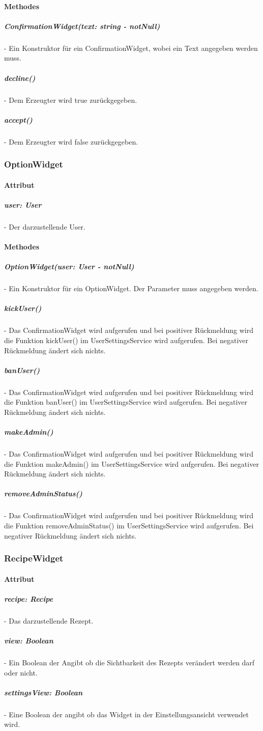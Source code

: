 \documentclass[parskip=full]{scrartcl}
\begin{document}
        \paragraph*{Methodes}
            \subparagraph*{ConfirmationWidget(text: string - notNull)} - Ein Konstruktor für ein ConfirmationWidget, wobei ein Text angegeben werden muss.
            \subparagraph*{decline()} - Dem Erzeugter wird true zurückgegeben.
            \subparagraph*{accept()} - Dem Erzeugter wird false zurückgegeben.

    \subsubsection{OptionWidget}
        \paragraph*{Attribut}
            \subparagraph*{user: User} - Der darzustellende User.

        \paragraph*{Methodes}
            \subparagraph*{OptionWidget(user: User - notNull)} - Ein Konstruktor für ein OptionWidget. Der Parameter muss angegeben werden. 
            \subparagraph*{kickUser()} - Das ConfirmationWidget wird aufgerufen und bei positiver Rückmeldung wird die Funktion kickUser() im UserSettingsService wird aufgerufen. Bei negativer Rückmeldung ändert sich nichts.
            \subparagraph*{banUser()} - Das ConfirmationWidget wird aufgerufen und bei positiver Rückmeldung wird die Funktion banUser() im UserSettingsService wird aufgerufen. Bei negativer Rückmeldung ändert sich nichts.
            \subparagraph*{makeAdmin()} - Das ConfirmationWidget wird aufgerufen und bei positiver Rückmeldung wird die Funktion makeAdmin() im UserSettingsService wird aufgerufen. Bei negativer Rückmeldung ändert sich nichts.
            \subparagraph*{removeAdminStatus()} - Das ConfirmationWidget wird aufgerufen und bei positiver Rückmeldung wird die Funktion removeAdminStatus() im UserSettingsService wird aufgerufen. Bei negativer Rückmeldung ändert sich nichts.

    \subsubsection{RecipeWidget}
        \paragraph*{Attribut}
            \subparagraph*{recipe: Recipe} - Das darzustellende Rezept.
            \subparagraph*{view: Boolean} - Ein Boolean der Angibt ob die Sichtbarkeit des Rezepts verändert werden darf oder nicht.
            \subparagraph*{settingsView: Boolean} - Eine Boolean der angibt ob das Widget in der Einstellungsansicht verwendet wird.
\end{document}
